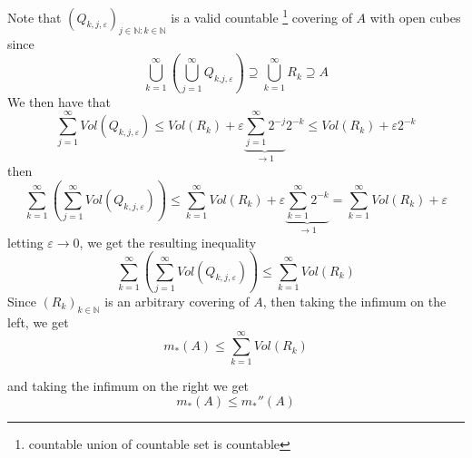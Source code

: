 \documentclass[12pt]{article}
\begin{document}
\begin{itemize}
		Note that $(Q_{k,j,\varepsilon})_{j \in \mathbb{N} \colon k \in \mathbb{N}}$ is a valid countable \footnote{countable union of countable set is countable} covering of $A$ with open cubes since
		$$ \bigcup_{k = 1}^\infty \left(\bigcup_{j = 1}^\infty Q_{k.j,\varepsilon}\right) \supseteq \bigcup_{k=1}^\infty R_k \supseteq A$$
		We then have that 
		$$ \sum_{j = 1}^\infty Vol(Q_{k,j,\varepsilon}) \leq  Vol(R_k) + \varepsilon \underbrace{\sum_{j=1}^\infty 2^{-j}}_{\to 1}  2^{-k} \leq Vol(R_k)  +\varepsilon 2^{-k}$$
		then 
		$$ \sum_{k=1}^\infty \left( \sum_{j=1}^\infty Vol(Q_{k,j,\varepsilon}) \right) \leq \sum_{k=1}^\infty Vol(R_k) + \varepsilon \underbrace{\sum_{k=1}^\infty 2^{-k}}_{\to 1} =  \sum_{k=1}^\infty Vol(R_k) + \varepsilon$$
		letting $\varepsilon \to 0$, we get the resulting inequality
		$$\sum_{k=1}^\infty \left( \sum_{j=1}^\infty Vol(Q_{k,j,\varepsilon})\right ) \leq \sum_{k=1}^\infty Vol(R_k)$$
			Since $(R_k)_{k \in \mathbb{N}}$ is an arbitrary covering of $A$, then taking the infimum on the left, we get
			$$ m_*(A) \leq \sum_{k=1}^\infty Vol(R_k)$$

			and taking the infimum on the right we get 
			$$ m_*(A) \leq m_*''(A)$$






	\end{itemize}
\end{document}

